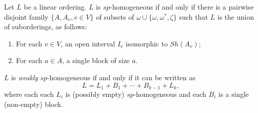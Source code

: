 \documentclass[11pt]{amsart}
\theoremstyle{definition}
\begin{document}
\begin{theorem}\label{thm:homogChar}  Let $L$ be a linear ordering.
$L$ is $sp$-homogeneous if and only if there is a pairwise disjoint family $\{A,A_v, v \in V\}$ of subsets of $\omega \cup \{\omega,\omega^*,\zeta\}$ such that $L$ is the union of suborderings, as follows: 

\begin{enumerate}
\item For each $v \in V$, an open interval $I_v$ isomorphic to $Sh(A_v)$;

\item For each $a \in A$, a single block of size $a$.
\end{enumerate}
\bigskip
$L$ is \emph{weakly} $sp$-homogeneous if and only if it can be written as
\[L=L_1+B_1+\cdots+B_{k-1}+L_{k},\]
where each each $L_i$ is (possibly empty) $sp$-homogeneous and each $B_i$ is a single (non-empty) block.
\end{theorem} 
\end{document}
